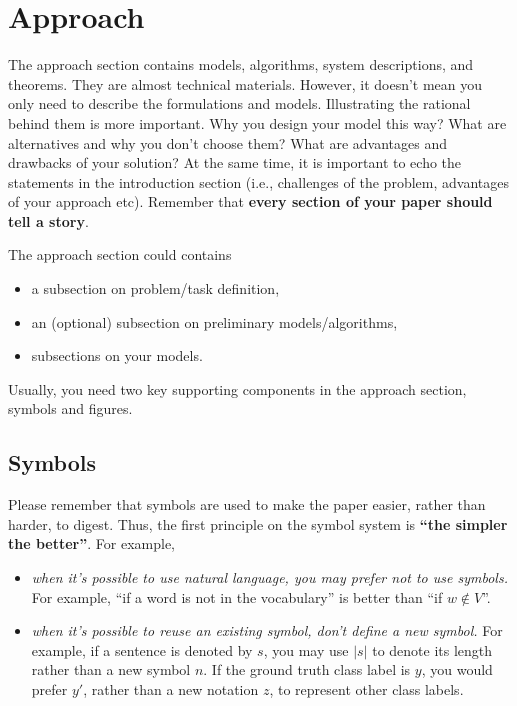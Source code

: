 \section{Approach}

The approach section contains models, algorithms, system descriptions, and theorems.
They are almost technical materials.
However, it doesn't mean you only need to describe the formulations and models.
Illustrating the rational behind them is more important.
Why you design your model this way? 
What are alternatives and why you don't choose them?
What are advantages and drawbacks of your solution?
At the same time, 
it is important to echo the statements in the introduction section
(i.e., challenges of the problem, advantages of your approach etc).
Remember that
\textbf{every section of your paper should tell a story}.

The approach section could contains
\begin{itemize}
    \item a subsection on problem/task definition,
    \item an (optional) subsection on preliminary models/algorithms,
    \item subsections on your models.
    \end{itemize}
Usually, you need two key supporting components in the approach section, 
symbols and figures.

\subsection{Symbols}
Please remember that 
symbols are used to make the paper easier, rather than harder, to digest.
Thus, the first principle on the symbol system is \textbf{``the simpler the better''}.
For example,
\begin{itemize}
    \item \emph{when it's possible to use natural language, 
        you may prefer not to use symbols. }
        For example, 
        ``if a word is not in the vocabulary'' is better than
        ``if $w \notin V$''.
    \item \emph{when it's possible to reuse an existing symbol, don't define a new symbol.}
        For example, if a sentence is denoted by $s$, 
        you may use $|s|$ to denote its length rather than a new symbol $n$.
        If the ground truth class label is $y$, you would prefer $y'$, 
        rather than a new notation $z$, to represent other class labels.
\end{itemize}

